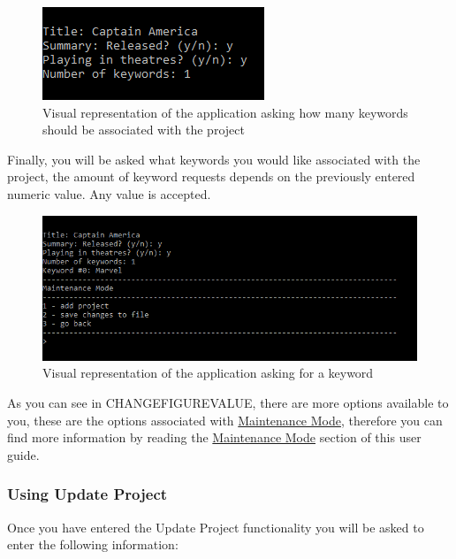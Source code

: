 \documentclass[
  english,
  a4paper,
,tablecaptionabove
]{scrartcl}
\begin{document}
\begin{figure}
\centering
\includegraphics{images/user-guide/maintenance-mode/add-project-keywords-amount.png}
\caption{Visual representation of the application asking how many
keywords should be associated with the project}
\end{figure}

Finally, you will be asked what keywords you would like associated with
the project, the amount of keyword requests depends on the previously
entered numeric value. Any value is accepted.

\begin{figure}
\centering
\includegraphics{images/user-guide/maintenance-mode/add-project-keywords.png}
\caption{Visual representation of the application asking for a keyword}
\end{figure}

As you can see in CHANGEFIGUREVALUE, there are more options available to
you, these are the options associated with
\protect\hyperlink{using-maintenance-mode}{Maintenance Mode}, therefore
you can find more information by reading the
\protect\hyperlink{using-maintenance-mode}{Maintenance Mode} section of
this user guide.

\newpage

\hypertarget{using-update-project}{%
\subsubsection{Using Update Project}\label{using-update-project}}

Once you have entered the Update Project functionality you will be asked
to enter the following information:
\end{document}
